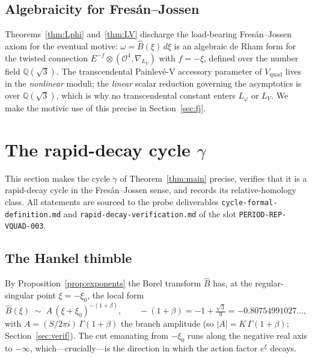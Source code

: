 \documentclass[11pt,reqno]{amsart}
\theoremstyle{plain}
\theoremstyle{definition}
\newcommand{\Vquad}{V_{\mathrm{quad}}}
\newcommand{\Bhat}{\widehat{B}}
\newcommand{\Lphi}{L_{\varphi}}
\newcommand{\LV}{L_{V}}
\newcommand{\Qsqrt}{\mathbb{Q}(\sqrt3)}
\newcommand{\xizero}{\xi_0}
\begin{document}
\subsection{Algebraicity for Fres\'an--Jossen}
Theorems~\ref{thm:Lphi} and~\ref{thm:LV} discharge the load-bearing Fres\'an--Jossen axiom for
the eventual motive: $\omega=\Bhat(\xi)\,d\xi$ is an algebraic de Rham form for the twisted
connection $E^{-f}\otimes(\mathcal{O}^4,\nabla_{\LV})$ with $f=-\xi$, defined over the number
field $\Qsqrt$. The transcendental Painlev\'e-V accessory parameter of $\Vquad$ lives in the
\emph{nonlinear} moduli; the \emph{linear} scalar reduction governing the asymptotics is over
$\Qsqrt$, which is why no transcendental constant enters $\Lphi$ or $\LV$. We make the motivic
use of this precise in Section~\ref{sec:fj}.

\section{The rapid-decay cycle \texorpdfstring{$\gamma$}{gamma}}\label{sec:cycle}

This section makes the cycle $\gamma$ of Theorem~\ref{thm:main} precise, verifies that it is a
rapid-decay cycle in the Fres\'an--Jossen sense, and records its relative-homology class. All
statements are sourced to the probe deliverables
\texttt{cycle-formal-definition.md} and \texttt{rapid-decay-verification.md} of the slot
\texttt{PERIOD-REP-VQUAD-003}.

\subsection{The Hankel thimble}
By Proposition~\ref{prop:exponents} the Borel transform $\Bhat$ has, at the regular-singular
point $\xi=-\xizero$, the local form
\begin{equation}\label{eq:branch-local}
  \Bhat(\xi)\;\sim\;A\,(\xi+\xizero)^{-(1+\beta)},\qquad
  -(1+\beta)=-1+\tfrac{\sqrt3}{9}=-0.80754991027\ldots,
\end{equation}
with $A=(S/2\pi i)\,\Gamma(1+\beta)$ the branch amplitude (so $\lvert A\rvert=K\,\Gamma(1+\beta)$;
Section~\ref{sec:verif}). The cut emanating from $-\xizero$ runs along the negative real axis to
$-\infty$, which---crucially---is the direction in which the action factor $e^{\xi}$ decays.
\end{document}
